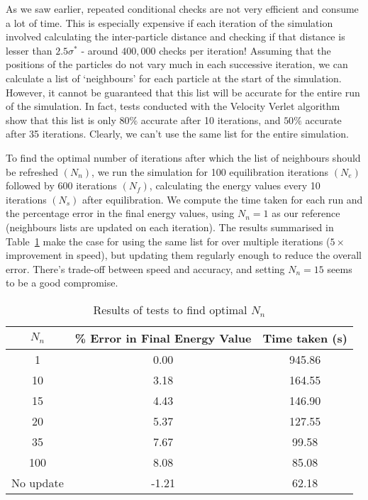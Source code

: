 \documentclass[../Main.tex]{subfiles}
\begin{document}
As we saw earlier, repeated conditional checks are not very efficient and consume a lot of time. This is especially expensive if each iteration of the simulation involved calculating the inter-particle distance and checking if that distance is lesser than $2.5 \sigma^{*}$ - around $400,000$ checks per iteration! Assuming that the positions of the particles do not vary much in each successive iteration, we can calculate a list of `neighbours' for each particle at the start of the simulation. However, it cannot be guaranteed that this list will be accurate for the entire run of the simulation. In fact, tests conducted with the Velocity Verlet algorithm show that this list is only $80\%$ accurate after 10 iterations, and $50\%$ accurate after 35 iterations. Clearly, we can't use the same list for the entire simulation.

To find the optimal number of iterations after which the list of neighbours should be refreshed $\left(N_{n}\right)$, we run the simulation for 100 equilibration iterations $\left(N_{e}\right)$ followed by 600 iterations $\left(N_{f}\right)$, calculating the energy values every 10 iterations $\left(N_{s}\right)$ after equilibration. We compute the time taken for each run and the percentage error in the final energy values, using $N_{n} = 1$ as our reference (neighbours lists are updated on each iteration). The results summarised in Table~\ref{tbl:results_neighbour_lists} make the case for using the same list for over multiple iterations ($5\times$ improvement in speed), but updating them regularly enough to reduce the overall error. There's trade-off between speed and accuracy, and setting $N_{n} = 15$ seems to be a good compromise. 

\begin{table}[h]
	\centering
	\begin{tabular}{ |c|c|c| }
		\hline
		$N_{n}$ & \% Error in Final Energy Value & Time taken (s) \\
		\hline
		1 & 0.00 &  945.86 \\ 
		10 & 3.18 & 164.55 \\
		15 & 4.43 & 146.90 \\
		20 & 5.37 & 127.55 \\
		35 & 7.67 & 99.58 \\
		100 & 8.08 & 85.08 \\
		No update & -1.21 & 62.18 \\
		\hline
	\end{tabular}
	\caption{Results of tests to find optimal $N_{n}$}
	\label{tbl:results_neighbour_lists}
\end{table}
\end{document}
